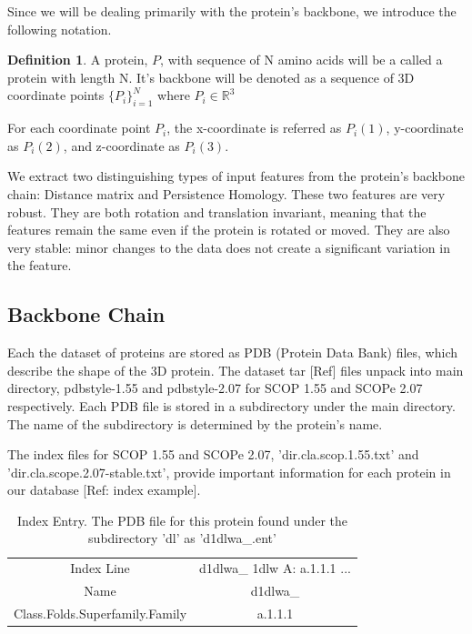 \documentclass[12pt, a4paper, twocolumn, fullpage]{article}
\theoremstyle{plain}
\theoremstyle{definition}
\newtheorem{defn}{Definition}[section]
\theoremstyle{remark}
\begin{document}
Since we will be dealing primarily with the protein's backbone, we introduce the following notation.
    
\begin{defn}
A protein, $P$, with sequence of N amino acids will be a called a protein with length N. It's backbone will be denoted as a sequence of 3D coordinate points $ \{P_i\}^{N}_{i=1} $ where $P_{i} \in \mathbb{R}^3 $

For each coordinate point $ P_{i} $, the x-coordinate is referred as $ P_{i}(1) $, y-coordinate as $ P_{i}(2) $, and z-coordinate as $ P_{i}(3) $.
\end{defn}

We extract two distinguishing types of input features from the protein's backbone chain: Distance matrix and Persistence Homology. These two features are very robust. They are both rotation and translation invariant, meaning that the features remain the same even if the protein is rotated or moved. They are also very stable: minor changes to the data does not create a significant variation in the feature.
    
\subsection{ Backbone Chain}
Each the dataset of proteins are stored as PDB (Protein Data Bank) files, which describe the shape of the 3D protein. The dataset tar [Ref] files unpack into main directory, pdbstyle-1.55 and pdbstyle-2.07 for SCOP 1.55 and SCOPe 2.07 respectively. Each PDB file is stored in a subdirectory under the main directory. The name of the subdirectory is determined by the protein's name.

The index files for SCOP 1.55 and SCOPe 2.07, 'dir.cla.scop.1.55.txt' and 'dir.cla.scope.2.07-stable.txt', provide important information for each protein in our database [Ref: index example]. 

\begin{table}[t]
    \centering
    \begin{tabular}{c | c}
        Index Line & d1dlwa\_ 1dlw    A:  a.1.1.1 ... \\
        Name & d1dlwa\_     \\
        Class.Folds.Superfamily.Family & a.1.1.1    \\
    \end{tabular}
    \caption{Index Entry. The PDB file for this protein found under the subdirectory 'dl' as 'd1dlwa\_.ent'}
    \label{tbl:Index Entry}
\end{table}
\end{document}
